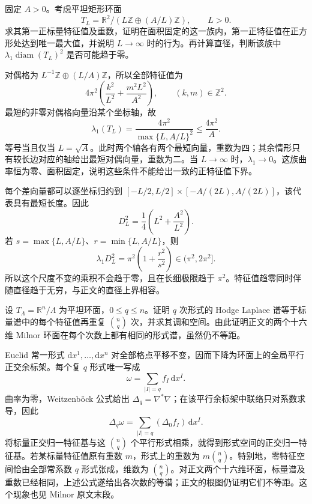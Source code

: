 \begin{exercise}\label{g3:ex:rectangular-torus-fixed-area-spectrum}
	固定 \(A>0\)。考虑平坦矩形环面
	\[
		T_L=\mathbb R^2/(L\mathbb Z\oplus(A/L)\mathbb Z),\qquad L>0.
	\]
	求其第一正标量特征值及重数，证明在面积固定的这一族内，第一正特征值在正方形处达到唯一最大值，并说明 \(L\to\infty\) 时的行为。再计算直径，判断该族中 \(\lambda_1\operatorname{diam}(T_L)^2\) 是否可能趋于零。
\end{exercise}
\begin{solution}
	对偶格为 \(L^{-1}\mathbb Z\oplus(L/A)\mathbb Z\)，所以全部特征值为
	\[
		4\pi^2\left(\frac{k^2}{L^2}+\frac{m^2L^2}{A^2}\right),
		\qquad (k,m)\in\mathbb Z^2.
	\]
	最短的非零对偶格向量沿某个坐标轴，故
	\[
		\lambda_1(T_L)=\frac{4\pi^2}{\max\{L,A/L\}^2}\le\frac{4\pi^2}{A}.
	\]
	等号当且仅当 \(L=\sqrt A\)。此时两个轴各有两个最短向量，重数为四；其余情形只有较长边对应的轴给出最短对偶向量，重数为二。当 \(L\to\infty\) 时，\(\lambda_1\to0\)。这族曲率恒为零、面积固定，说明这些条件不能给出一致的正特征值下界。

	每个差向量都可以逐坐标归约到 \([-L/2,L/2]\times[-A/(2L),A/(2L)]\)，该代表具有最短长度。因此
	\[
		D_L^2=\frac14\left(L^2+\frac{A^2}{L^2}\right).
	\]
	若 \(s=\max\{L,A/L\}\)、\(r=\min\{L,A/L\}\)，则
	\[
		\lambda_1D_L^2=\pi^2\left(1+\frac{r^2}{s^2}\right)\in(\pi^2,2\pi^2].
	\]
	所以这个尺度不变的乘积不会趋于零，且在长细极限趋于 \(\pi^2\)。特征值趋零同时伴随直径趋于无穷，与正文的直径上界相容。
\end{solution}

\begin{exercise}\label{g3:ex:milnor-all-form-spectra}
	设 \(T_\Lambda=\mathbb R^n/\Lambda\) 为平坦环面，\(0\le q\le n\)。证明 \(q\) 次形式的 Hodge Laplace 谱等于标量谱中的每个特征值再重复 \(\binom nq\) 次，并求其调和空间。由此证明正文的两个十六维 Milnor 环面在每个次数上都有相同的形式谱，虽然仍不等距。
\end{exercise}
\begin{solution}
	Euclid 常一形式 \(\mathrm dx^1,\ldots,\mathrm dx^n\) 对全部格点平移不变，因而下降为环面上的全局平行正交余标架。每个复 \(q\) 形式唯一写成
	\[
		\omega=\sum_{|I|=q}f_I\,\mathrm dx^I.
	\]
	曲率为零，Weitzenböck 公式给出 \(\Delta_q=\nabla^*\nabla\)；在该平行余标架中联络只对系数求导，因此
	\[
		\Delta_q\omega=\sum_{|I|=q}(\Delta_0f_I)\,\mathrm dx^I.
	\]
	将标量正交归一特征基与这 \(\binom nq\) 个平行形式相乘，就得到形式空间的正交归一特征基。若某标量特征值原有重数 \(m\)，形式上的重数为 \(m\binom nq\)。特别地，零特征空间恰由全部常系数 \(q\) 形式张成，维数为 \(\binom nq\)。对正文两个十六维环面，标量谱及重数已经相同，上述公式遂给出各次数的等谱；正文的根图仍证明它们不等距。这个现象也见 Milnor 原文末段。\cite[第542页]{Milnor1964Isospectral}
\end{solution}
